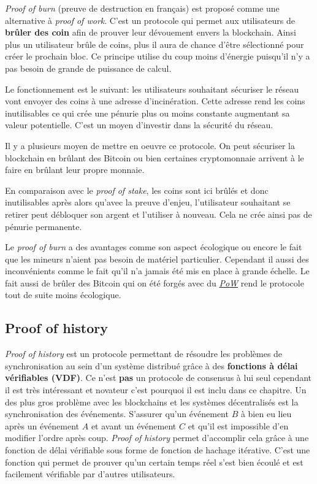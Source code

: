 \textit{Proof of burn} (preuve de destruction en français) est proposé comme une alternative à \textit{proof of work}. C'est un protocole qui permet aux utilisateurs de \textbf{brûler des coin} afin de prouver leur dévouement envers la blockchain. Ainsi plus un utilisateur brûle de coins, plus il aura de chance d'être sélectionné pour créer le prochain bloc. Ce principe utilise du coup moins d'énergie puisqu'il n'y a pas besoin de grande de puissance de calcul.

Le fonctionnement est le suivant: les utilisateurs souhaitant sécuriser le réseau vont envoyer des coins à une adresse d'incinération. Cette adresse rend les coins inutilisables ce qui crée une pénurie plus ou moins constante augmentant sa valeur potentielle. C'est un moyen d'investir dans la sécurité du réseau.

Il y a plusieurs moyen de mettre en oeuvre ce protocole. On peut sécuriser la blockchain en brûlant des Bitcoin ou bien certaines cryptomonnaie arrivent à le faire en brûlant leur propre monnaie.

En comparaison avec le \textit{proof of stake}, les coins sont ici brûlés et donc inutilisables après alors qu'avec la preuve d'enjeu, l'utilisateur souhaitant se retirer peut débloquer son argent et l'utiliser à nouveau. Cela ne crée ainsi pas de pénurie permanente.

Le \textit{proof of burn} a des avantages comme son aspect écologique ou encore le fait que les mineurs n'aient pas besoin de matériel particulier. Cependant il aussi des inconvénients comme le fait qu'il n'a jamais été mis en place à grande échelle. Le fait aussi de brûler des Bitcoin qui on été forgés avec du \hyperref[consensus:pow]{\textit{PoW}} rend le protocole tout de suite moins écologique.

\subsection{Proof of history}

\textit{Proof of history} \cite{proof:poh} est un protocole permettant de résoudre les problèmes de synchronisation au sein d'un système distribué grâce à des \textbf{fonctions à délai vérifiables (VDF)}. Ce n'est \textbf{pas} un protocole de consensus à lui seul cependant il est très intéressant et novateur c'est pourquoi il est inclu dans ce chapitre. Un des plus gros problème avec les blockchains et les systèmes décentralisés est la synchronisation des événements. S'assurer qu'un événement $B$ à bien eu lieu après un événement $A$ et avant un événement $C$ et qu'il est impossible d'en modifier l'ordre après coup. \textit{Proof of history} permet d'accomplir cela grâce à une fonction de délai vérifiable sous forme de fonction de hachage itérative. C'est une fonction qui permet de prouver qu'un certain temps réel s'est bien écoulé et est facilement vérifiable par d'autres utilisateurs.

